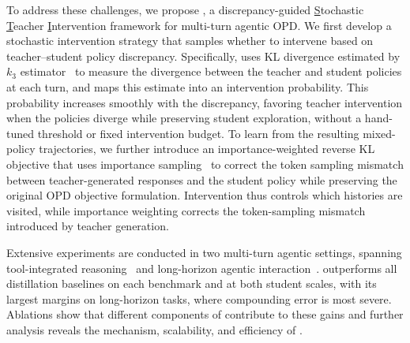 To address these challenges, we propose \name, a discrepancy-guided \underline{S}tochastic \underline{T}eacher \underline{I}ntervention framework for multi-turn agentic OPD.
We first develop a stochastic intervention strategy that samples whether to intervene based on teacher--student policy discrepancy. 
Specifically, \name uses KL divergence estimated by $k_3$ estimator~\citep{Schulman2020KL} to measure the divergence between the teacher and student policies at each turn, and maps this estimate into an intervention probability.
This probability increases smoothly with the discrepancy, favoring teacher intervention when the policies diverge while preserving student exploration, without a hand-tuned threshold or fixed intervention budget.
To learn from the resulting mixed-policy trajectories, we further introduce an importance-weighted reverse KL objective that uses importance sampling~\citep{SchulmanWDRK17} to correct the token sampling mismatch between teacher-generated responses and the student policy while preserving the original OPD objective formulation.
Intervention thus controls which histories are visited, while importance weighting corrects the token-sampling mismatch introduced by teacher generation. 

Extensive experiments are conducted in two multi-turn agentic settings, spanning tool-integrated reasoning~\citep{aime24,aime25,aime26,abs-2605-00674,abs-2311-12022,JainHGLYZWSSS25} and long-horizon agentic interaction~\citep{ShridharYCBTH21,WangJCA22}.
\name outperforms all distillation baselines on each benchmark and at both student scales, with its largest margins on long-horizon tasks, where compounding error is most severe. 
Ablations show that different components of \name contribute to these gains and further analysis reveals the mechanism, scalability, and efficiency of \name. 

